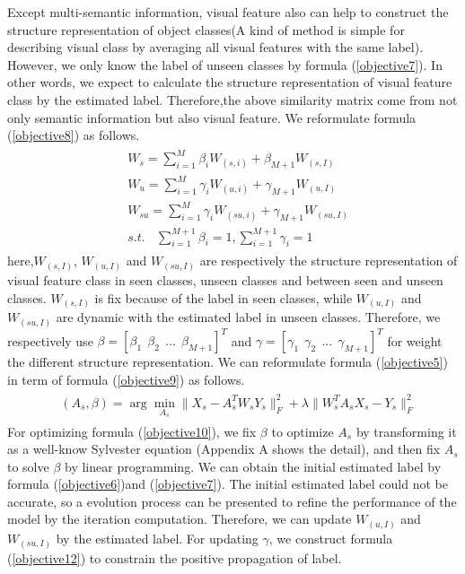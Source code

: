 \documentclass[review]{elsarticle}
\begin{document}
Except multi-semantic information, visual feature also can help to construct the structure representation of object classes(A kind of method is simple for describing visual class by averaging all visual features with the same label). However, we only know the label of unseen classes by formula (\ref{objective7}). In other words, we expect to calculate the structure representation of visual feature class by the estimated label. Therefore,the above similarity matrix come from not only semantic information but also visual feature. We reformulate formula (\ref{objective8}) as follows.
\begin{align}
\label{objective9}
\begin{aligned}
&W_{s}=\sum^{M}_{i=1}\beta_{i}W_{(s,i)}+\beta_{M+1}W_{(s,I)}\\
&W_{u}=\sum^{M}_{i=1}\gamma_{i}W_{(u,i)}+\gamma_{M+1}W_{(u,I)}\\
&W_{su}=\sum^{M}_{i=1}\gamma_{i}W_{(su,i)}+\gamma_{M+1}W_{(su,I)}\\
&s.t.~~~~\sum^{M+1}_{i=1}\beta_{i}=1,\sum^{M+1}_{i=1}\gamma_{i}=1
 \end{aligned}
\end{align}
here,$W_{(s,I)}$, $W_{(u,I)}$ and $W_{(su,I)}$ are respectively the structure representation of visual feature class in seen classes, unseen classes and between seen and unseen classes. $W_{(s,I)}$ is fix because of the label in seen classes, while $W_{(u,I)}$ and $W_{(su,I)}$ are dynamic with the estimated label in unseen classes. Therefore, we respectively use $\beta=[\beta_{1}~~\beta_{2}~~ ...~~ \beta_{M+1}]^{T}$ and $\gamma=[\gamma_{1}~~\gamma_{2}~~ ...~~ \gamma_{M+1}]^{T}$ for weight the different structure representation. We can reformulate formula (\ref{objective5}) in term of formula (\ref{objective9}) as follows.
\begin{align}
\label{objective10}
\begin{aligned}
&(A_{s}, \beta)=\arg \min_{A_{s}}\|X_{s}-A_{s}^{T}W_{s}Y_{s}\|^{2}_{F}+\lambda\|W_{s}^{T}A_{s}X_{s}-Y_{s}\|^{2}_{F}
 \end{aligned}
\end{align}
For optimizing formula (\ref{objective10}), we fix $\beta$ to optimize $A_{s}$ by transforming it as a well-know Sylvester equation (Appendix A shows the detail), and then fix $A_{s}$ to solve $\beta$ by linear programming. We can obtain the initial estimated label by formula (\ref{objective6})and (\ref{objective7}). The initial estimated label could not be accurate, so a evolution process can be presented to refine the performance of the model by the iteration computation. Therefore, we can update $W_{(u,I)}$ and $W_{(su,I)}$ by the estimated label. For updating $\gamma$, we construct formula (\ref{objective12}) to constrain the positive propagation of label.
\end{document}
